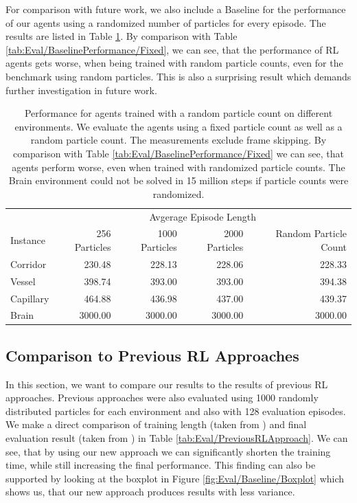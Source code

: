 For comparison with future work, we also include a Baseline for the performance of our agents using a randomized number of particles for every episode. The results are listed in Table \ref{tab:Eval/BaselinePerformance/RPC}. By comparison with Table \ref{tab:Eval/BaselinePerformance/Fixed}, we can see, that the performance of RL agents gets worse, when being trained with random particle counts, even for the benchmark using random particles. This is also a surprising result which demands further investigation in future work. 

\begin{table} [htp]
    \begin{center}
        \begin{tabular}{lrrrr}
            \toprule
            & \multicolumn{4}{c}{Avgerage Episode Length} \\
            \cmidrule(lr){2-5}
            Instance & 256 Particles & 1000 Particles & 2000 Particles & Random Particle Count \\
            \midrule
            Corridor & 230.48 & 228.13 & 228.06 & 228.33 \\
            Vessel & 398.74 & 393.00 & 393.00 & 394.38 \\
            Capillary & 464.88 & 436.98 & 437.00 & 439.37 \\
            Brain & 3000.00 & 3000.00 & 3000.00 & 3000.00  \\
            \bottomrule
        \end{tabular}

    \end{center}
    \caption[Baseline Performance for Agents Trained with a Random Particle Count]{Performance for agents trained with a random particle count on different environments. We evaluate the agents using a fixed particle count as well as a random particle count. The measurements exclude frame skipping. By comparison with Table \ref{tab:Eval/BaselinePerformance/Fixed} we can see, that agents perform worse, even when trained with randomized particle counts. The Brain environment could not be solved in 15 million steps if particle counts were randomized.} \label{tab:Eval/BaselinePerformance/RPC}
\end{table}


\subsection{Comparison to Previous RL Approaches} \label{sec:EvalRLComparison}
In this section, we want to compare our results to the results of previous RL approaches. Previous approaches were also evaluated using 1000 randomly distributed particles for each environment and also with 128 evaluation episodes. We make a direct comparison of training length (taken from \cite{huang2019}) and final evaluation result (taken from \cite{becker2020}) in Table \ref{tab:Eval/PreviousRLApproach}. We can see, that by using our new approach we can significantly shorten the training time, while still increasing the final performance. This finding can also be supported by looking at the boxplot in Figure \ref{fig:Eval/Baseline/Boxplot} which shows us, that our new approach produces results with less variance. 

